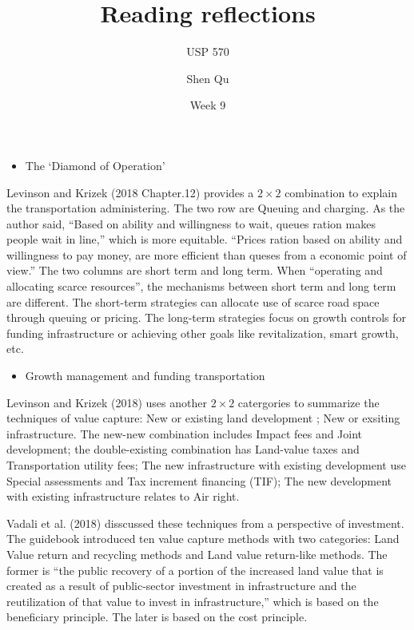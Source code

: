 \documentclass[12pt,]{article}
\title{Reading reflections}
\subtitle{USP 570}
\author{Shen Qu}
\date{Week 9}
\providecommand{\tightlist}{%
  \setlength{\itemsep}{0pt}\setlength{\parskip}{0pt}}
\begin{document}
\maketitle

\begin{itemize}
\tightlist
\item
  The `Diamond of Operation'
\end{itemize}

Levinson and Krizek (2018 Chapter.12) provides a \(2\times2\)
combination to explain the transportation administering. The two row are
Queuing and charging. As the author said, ``Based on ability and
willingness to wait, queues ration makes people wait in line,'' which is
more equitable. ``Prices ration based on ability and willingness to pay
money, are more efficient than queses from a economic point of view.''
The two columns are short term and long term. When ``operating and
allocating scarce resources'', the mechanisms between short term and
long term are different. The short-term strategies can allocate use of
scarce road space through queuing or pricing. The long-term strategies
focus on growth controls for funding infrastructure or achieving other
goals like revitalization, smart growth, etc.

\begin{itemize}
\tightlist
\item
  Growth management and funding transportation
\end{itemize}

Levinson and Krizek (2018) uses another \(2\times2\) catergories to
summarize the techniques of value capture: New or existing land
development ; New or exsiting infrastructure. The new-new combination
includes Impact fees and Joint development; the double-existing
combination has Land-value taxes and Transportation utility fees; The
new infrastructure with existing development use Special assessments and
Tax increment financing (TIF); The new development with existing
infrastructure relates to Air right.

Vadali et al. (2018) disscussed these techniques from a perspective of
investment. The guidebook introduced ten value capture methods with two
categories: Land Value return and recycling methods and Land value
return-like methods. The former is ``the public recovery of a portion of
the increased land value that is created as a result of public-sector
investment in infrastructure and the reutilization of that value to
invest in infrastructure,'' which is based on the beneficiary principle.
The later is based on the cost principle.
\end{document}
